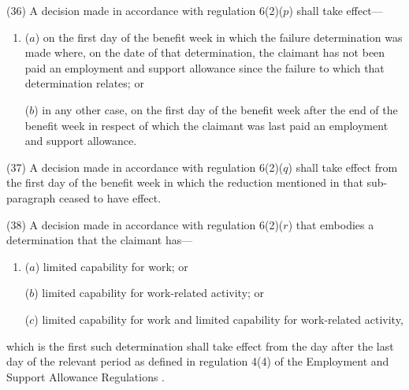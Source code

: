 \documentclass[12pt,a4paper]{article}
\begin{document}


(36) A decision made in accordance with regulation 6(2)($p$) shall take effect—
\begin{enumerate}\item[]
($a$) on the first day of the benefit week in which the failure determination was made where, on the date of that determination, the claimant has not been paid an employment and support allowance since the failure to which that determination relates; or

($b$) in any other case, on the first day of the benefit week after the end of the benefit week in respect of which the claimant was last paid an employment and support allowance.
\end{enumerate}

(37) A decision made in accordance with regulation 6(2)($q$)  shall take effect from the first day of the benefit week in which the reduction mentioned in that sub-paragraph ceased to have effect.


(38) A decision made in accordance with regulation 6(2)($r$) that embodies a determination that the claimant has—
\begin{enumerate}\item[]
($a$) limited capability for work; or

($b$) limited capability for work-related activity; or

($c$) limited capability for work and limited capability for work-related activity,
\end{enumerate}
which is the first such determination shall take effect from 
the day after the last day of the relevant period as defined in regulation 4(4) of the Employment and Support Allowance Regulations%
.
\end{document}
